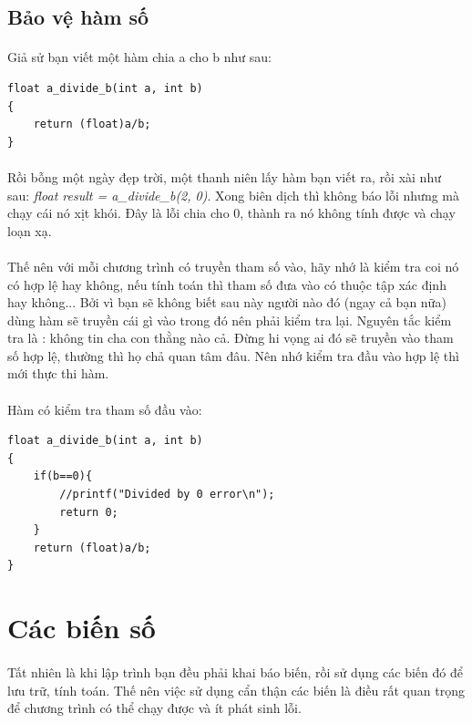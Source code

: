 \documentclass[12pt,a5paper]{book}
\begin{document}
\subsection{Bảo vệ hàm số}
\paragraph{}
Giả sử bạn viết một hàm chia a cho b như sau:
\begin{lstlisting}
float a_divide_b(int a, int b)
{
	return (float)a/b;
}
\end{lstlisting}

\paragraph{}
Rồi bỗng một ngày đẹp trời, một thanh niên lấy hàm bạn viết ra, rồi xài như sau: \textit{float result = a\_divide\_b(2, 0)}. Xong biên dịch thì không báo lỗi nhưng mà chạy cái nó xịt khói. Đây là lỗi chia cho 0, thành ra nó không tính được và chạy loạn xạ.
\paragraph{}
Thế nên với mỗi chương trình có truyền tham số vào, hãy nhớ là kiểm tra coi nó có hợp lệ hay không, nếu tính toán thì tham số đưa vào có thuộc tập xác định hay không... Bởi vì bạn sẽ không biết sau này người nào đó (ngay cả bạn nữa) dùng hàm sẽ truyền cái gì vào trong đó nên phải kiểm tra lại. Nguyên tắc kiểm tra là : không tin cha con thằng nào cả. Đừng hi vọng ai đó sẽ truyền vào tham số hợp lệ, thường thì họ chả quan tâm đâu. Nên nhớ kiểm tra đầu vào hợp lệ thì mới thực thi hàm.
\paragraph{}
Hàm có kiểm tra tham số đầu vào:
\begin{lstlisting}
float a_divide_b(int a, int b)
{
	if(b==0){
		//printf("Divided by 0 error\n");
		return 0;
	}
	return (float)a/b;
}
\end{lstlisting}

\section{Các biến số}
\paragraph{}
Tất nhiên là khi lập trình bạn đều phải khai báo biến, rồi sử dụng các biến đó để lưu trữ, tính toán. Thế nên việc sử dụng cẩn thận các biến là điều rất quan trọng để chương trình có thể chạy được và ít phát sinh lỗi.
\end{document}

